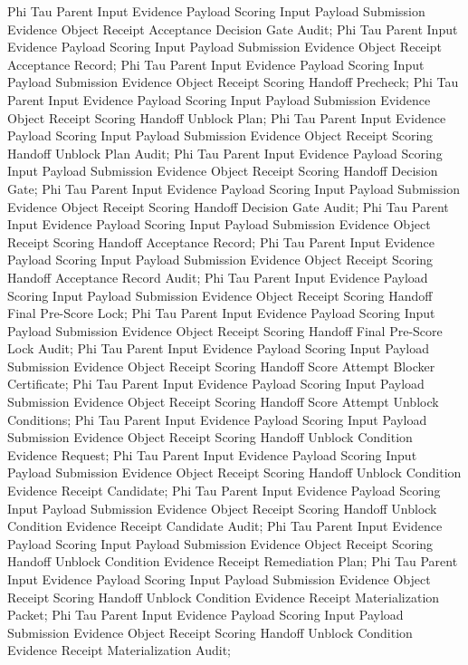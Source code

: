 \documentclass[11pt]{article}
\begin{document}
Phi Tau Parent Input Evidence Payload Scoring Input Payload Submission Evidence Object Receipt Acceptance Decision Gate Audit;
Phi Tau Parent Input Evidence Payload Scoring Input Payload Submission Evidence Object Receipt Acceptance Record;
Phi Tau Parent Input Evidence Payload Scoring Input Payload Submission Evidence Object Receipt Scoring Handoff Precheck;
Phi Tau Parent Input Evidence Payload Scoring Input Payload Submission Evidence Object Receipt Scoring Handoff Unblock Plan;
Phi Tau Parent Input Evidence Payload Scoring Input Payload Submission Evidence Object Receipt Scoring Handoff Unblock Plan Audit;
Phi Tau Parent Input Evidence Payload Scoring Input Payload Submission Evidence Object Receipt Scoring Handoff Decision Gate;
Phi Tau Parent Input Evidence Payload Scoring Input Payload Submission Evidence Object Receipt Scoring Handoff Decision Gate Audit;
Phi Tau Parent Input Evidence Payload Scoring Input Payload Submission Evidence Object Receipt Scoring Handoff Acceptance Record;
Phi Tau Parent Input Evidence Payload Scoring Input Payload Submission Evidence Object Receipt Scoring Handoff Acceptance Record Audit;
Phi Tau Parent Input Evidence Payload Scoring Input Payload Submission Evidence Object Receipt Scoring Handoff Final Pre-Score Lock;
Phi Tau Parent Input Evidence Payload Scoring Input Payload Submission Evidence Object Receipt Scoring Handoff Final Pre-Score Lock Audit;
Phi Tau Parent Input Evidence Payload Scoring Input Payload Submission Evidence Object Receipt Scoring Handoff Score Attempt Blocker Certificate;
Phi Tau Parent Input Evidence Payload Scoring Input Payload Submission Evidence Object Receipt Scoring Handoff Score Attempt Unblock Conditions;
Phi Tau Parent Input Evidence Payload Scoring Input Payload Submission Evidence Object Receipt Scoring Handoff Unblock Condition Evidence Request;
Phi Tau Parent Input Evidence Payload Scoring Input Payload Submission Evidence Object Receipt Scoring Handoff Unblock Condition Evidence Receipt Candidate;
Phi Tau Parent Input Evidence Payload Scoring Input Payload Submission Evidence Object Receipt Scoring Handoff Unblock Condition Evidence Receipt Candidate Audit;
Phi Tau Parent Input Evidence Payload Scoring Input Payload Submission Evidence Object Receipt Scoring Handoff Unblock Condition Evidence Receipt Remediation Plan;
Phi Tau Parent Input Evidence Payload Scoring Input Payload Submission Evidence Object Receipt Scoring Handoff Unblock Condition Evidence Receipt Materialization Packet;
Phi Tau Parent Input Evidence Payload Scoring Input Payload Submission Evidence Object Receipt Scoring Handoff Unblock Condition Evidence Receipt Materialization Audit;
\end{document}
